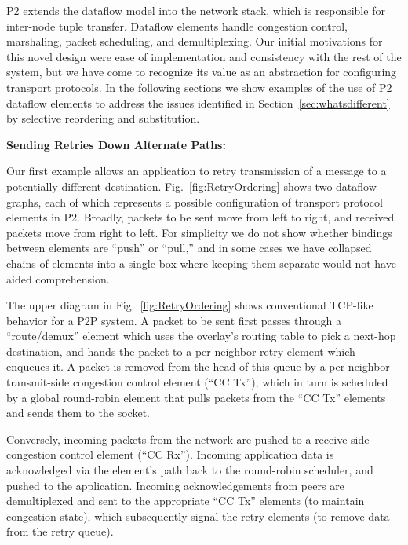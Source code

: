 \documentclass[10pt,twocolumn]{article}
\renewcommand{\subsection}[1]{\vspace{10pt}\noindent\textbf{#1:}\vspace{5pt}}
\begin{document}
P2 extends the dataflow model into the network stack, which is responsible
for inter-node tuple transfer.  Dataflow elements handle congestion
control, marshaling, packet scheduling, and demultiplexing.  Our
initial motivations for this novel design were ease of implementation
and consistency with the rest of the system, but we have come to
recognize its value as an abstraction for configuring transport protocols.  In the
following sections we show examples of the use of P2 dataflow elements
to address the issues identified in Section~\ref{sec:whatsdifferent}
by selective reordering and substitution.

\subsection{Sending Retries Down Alternate Paths}

Our first example allows an application to retry transmission of a
message to a potentially different destination.
Fig.~\ref{fig:RetryOrdering} shows two dataflow graphs, each of which
represents a possible configuration of transport protocol elements in
P2.  Broadly, packets to be sent move from left to right, and received
packets move from right to left.  For simplicity we do not show
whether bindings between elements are ``push'' or ``pull,'' and in
some cases we have collapsed chains of elements into a single box
where keeping them separate would not have aided comprehension.    

The upper diagram in Fig.~\ref{fig:RetryOrdering} shows conventional
TCP-like behavior for a P2P system.  A packet to be sent first passes
through a ``route/demux'' element which uses the overlay's routing
table to pick a next-hop destination, and hands the packet to a
per-neighbor retry element which enqueues it.  A packet is removed
from the head of this queue by a per-neighbor transmit-side congestion
control element (``CC Tx''), which in turn is scheduled by a global
round-robin element that pulls packets from the ``CC Tx'' elements
and sends them to the socket. 

Conversely, incoming packets from the network are pushed to a
receive-side congestion control element (``CC Rx'').
Incoming application data is acknowledged via the element's
path back to the round-robin scheduler, and pushed to the application.
Incoming acknowledgements from peers are demultiplexed and sent to the
appropriate ``CC Tx'' elements (to maintain congestion state), which
subsequently signal the retry elements (to remove data from the retry queue). 
\end{document}
